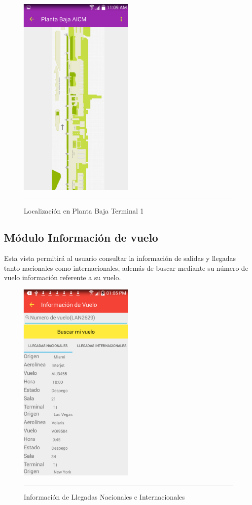 \begin{figure}[h]
	\centering
		\includegraphics[width=0.5\textwidth]{Figuras/ubikpb.png}
		\rule{30em}{0.5pt}
	\caption[Localización en Planta Baja Terminal 1]{Localización en Planta Baja Terminal 1}
	\label{fig:indoorPB}
\end{figure}
\clearpage

\subsection{Módulo Información de vuelo}
Esta vista permitirá al usuario consultar la información de salidas y llegadas tanto nacionales como internacionales, 
además de buscar mediante su número de vuelo información referente a su vuelo.

\begin{figure}[h]
	\centering
		\includegraphics[width=0.5\textwidth]{Figuras/llegadas.png}
		\rule{30em}{0.5pt}
	\caption[Información de Llegadas Nacionales e Internacionales]{Información de Llegadas Nacionales e Internacionales}
	\label{fig:infoLlegadas}
\end{figure}

